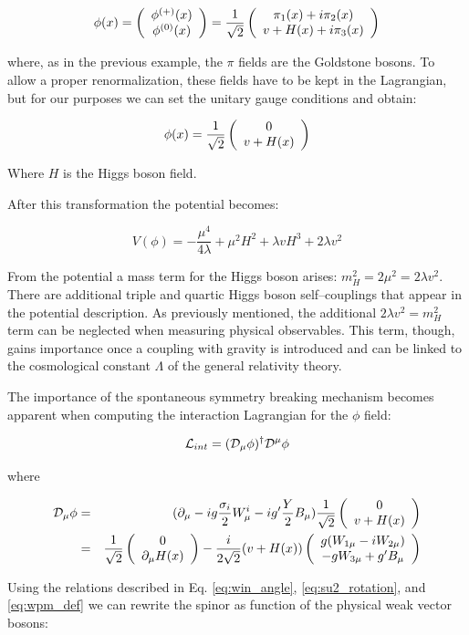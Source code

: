 \begin{equation}
\phi(x) = \left(\begin{array}{c}\phi^{(+)}(x) \\\phi^{(0)}(x)\end{array}\right) = \dfrac{1}{\sqrt{2}} \left(\begin{array}{c} \pi_1(x) + i \pi_2(x)  \\ v + H(x) + i \pi_3(x) \end{array}\right)
\end{equation}

where, as in the previous example, the $\pi$ fields are the Goldstone bosons.  To allow a proper renormalization, these fields have to be kept in the Lagrangian, but for our purposes we can set the unitary gauge conditions and obtain:

\begin{equation}
\phi(x) = \dfrac{1}{\sqrt{2}} \left(\begin{array}{c} 0  \\ v + H(x) \end{array}\right)
\end{equation}

Where $H$ is the Higgs boson field.

After this transformation the potential becomes:

\begin{equation}
V(\phi) = -\dfrac{\mu^4}{4\lambda} + \mu^2H^2 + \lambda v H^3 + 2 \lambda v^2
\end{equation}

From the potential a mass term for the Higgs boson arises: $m^{2}_H = 2\mu^2 = 2 \lambda v^2$. There are additional triple and quartic Higgs boson self--couplings that appear in the potential description. As previously mentioned, the additional $2 \lambda v^2 = m^{2}_H$ term can be neglected when measuring physical observables. This term, though, gains importance once a coupling with gravity is introduced and can be linked to the cosmological constant $\Lambda$ of the general relativity theory.

The importance of the spontaneous symmetry breaking mechanism becomes apparent when computing the interaction Lagrangian for the $\phi$ field:

\begin{equation}
\mathcal{L}_{int} = (\mathcal{D}_\mu\phi)^\dagger\mathcal{D}^\mu\phi
\end{equation}

where

\begin{eqnarray}
\mathcal{D}_\mu \phi &=& (\partial_\mu - ig\dfrac{\sigma_i}{2}W^i_\mu - ig'\dfrac{Y}{2}B_\mu) \dfrac{1}{\sqrt{2}} \left(\begin{array}{c}0 \\v+H(x)\end{array}\right) \nonumber \\
&=& \dfrac{1}{\sqrt{2}} \left(\begin{array}{c}0 \\\partial_\mu H(x)\end{array}\right) - \dfrac{i}{2\sqrt{2}} (v+H(x)) \left(\begin{array}{c}g(W_{1\mu} - i W_{2\mu}) \\-g W_{3\mu} + g'B_\mu\end{array}\right)
\end{eqnarray}

Using the relations described in Eq. \ref{eq:win_angle}, \ref{eq:su2_rotation}, and \ref{eq:wpm_def} we can rewrite the spinor as function of the physical weak vector bosons:

